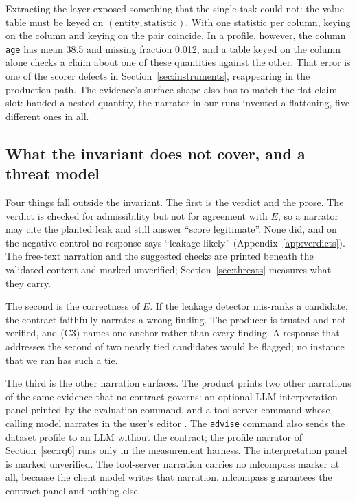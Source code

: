 \documentclass[smallextended,natbib]{svjour3}
\begin{document}
Extracting the layer exposed something that the single task could not: the
value table must be keyed on $(\text{entity}, \text{statistic})$. With one
statistic per column, keying on the column and keying on the pair coincide. In a profile, however, the
column \texttt{age} has mean 38.5 and missing fraction 0.012, and a table
keyed on the column alone checks a claim about one of these quantities against
the other. That error is one of the scorer defects in
Section~\ref{sec:instruments}, reappearing in the production path. The
evidence's surface shape also has to match the flat claim slot: handed a
nested quantity, the narrator in our runs invented a flattening, five
different ones in all.

\subsection{What the invariant does not cover, and a threat model}

Four things fall outside the invariant. The first is the verdict and the
prose. The verdict is checked for admissibility but not for agreement with
$E$, so a narrator may cite the planted leak and still answer ``score
legitimate''. None did, and on the negative control no response says
``leakage likely'' (Appendix~\ref{app:verdicts}). 
The free-text narration and the suggested checks are printed beneath the
validated content and marked unverified; Section~\ref{sec:threats} measures
what they carry.

The second is the correctness of $E$. If the leakage detector mis-ranks a
candidate, the contract faithfully narrates a wrong finding. The producer is
trusted and not verified, and (C3) names one anchor rather than every
finding. A response that addresses the second of two nearly tied candidates
would be flagged; no instance that we ran has such a tie.

The third is the other narration surfaces. The product prints two other
narrations of the same evidence that no contract governs: an optional LLM
interpretation panel printed by the evaluation command, and a tool-server
command whose calling model narrates in the user's editor \citep{mcp}. The
\texttt{advise} command also sends the dataset profile to an LLM without the
contract; the profile narrator of Section~\ref{sec:rq6} runs only in the
measurement harness. The
interpretation panel is marked unverified. The tool-server narration carries
no mlcompass marker at all, because the client model writes that narration.
mlcompass guarantees the contract panel and nothing else.
\end{document}
